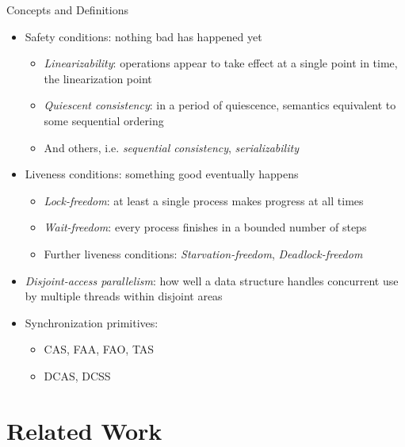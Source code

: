 \documentclass[usenames,dvipsnames]{beamer}
\begin{document}
\begin{frame}[allowframebreaks]{Concepts and Definitions}
\begin{itemize}
\item Safety conditions: nothing bad has happened yet
    \begin{itemize}
    \item \emph{Linearizability}: operations appear to take effect at a single point in time, the linearization point
    \item \emph{Quiescent consistency}: in a period of quiescence, semantics equivalent to some sequential ordering
    \item And others, i.e. \emph{sequential consistency}, \emph{serializability}
    \end{itemize}

\framebreak

\item Liveness conditions: something good eventually happens
    \begin{itemize}
    \item \emph{Lock-freedom}: at least a single process makes progress at all times
    \item \emph{Wait-freedom}: every process finishes in a bounded number of steps
    \item Further liveness conditions: \emph{Starvation-freedom}, \emph{Deadlock-freedom}
    \end{itemize}

\framebreak

\item \emph{Disjoint-access parallelism}: how well a data structure handles concurrent use by multiple
      threads within disjoint areas
\item Synchronization primitives:
    \begin{itemize}
    \item \ac{CAS}, \ac{FAA}, \ac{FAO}, \ac{TAS}
    \item \ac{DCAS}, \ac{DCSS}
    \end{itemize}

\end{itemize}

\end{frame}

\section{Related Work} \label{sec:related}
\end{document}

